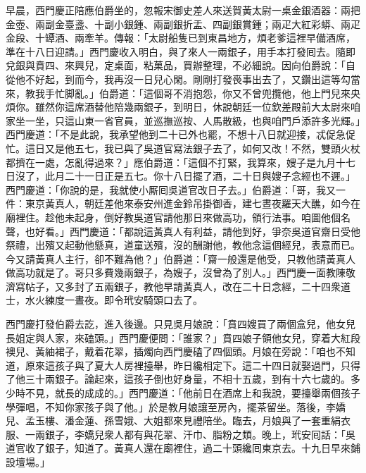 早晨，西門慶正陪應伯爵坐的，忽報宋御史差人來送賀黃太尉一桌金銀酒器：兩把金壺、兩副金臺盞、十副小銀鍾、兩副銀折盂、四副銀賞鍾；兩疋大紅彩蟒、兩疋金段、十罈酒、兩牽羊。傳報：「太尉船隻已到東昌地方，煩老爹這裡早備酒席，準在十八日迎請。」西門慶收入明白，與了來人一兩銀子，用手本打發囘去。隨即兌銀與賁四、來興兒，定桌面，粘菓品，買辦整理，不必細說。因向伯爵說：「自從他不好起，到而今，我再沒一日兒心閑。剛剛打發䘮事出去了，又鑽出這等勾當來，教我手忙脚亂。」{}伯爵道：「這個哥不消抱怨，你又不曾兜攬他，他上門兒來央煩你。雖然你這席酒替他陪幾兩銀子，到明日，休說朝廷一位欽差殿前大太尉來咱家坐一坐，只這山東一省官員，並巡撫巡按、人馬散級，也與咱門戶添許多光輝。」{}西門慶道：「不是此說，我承望他到二十已外也罷，不想十八日就迎接，忒促急促忙。這日又是他五七，我已與了吳道官寫法銀子去了，如何又改！不然，雙頭火杖都擠在一處，怎亂得過來？」應伯爵道：「這個不打緊，我算來，嫂子是九月十七日沒了，此月二十一日正是五七。你十八日擺了酒，二十日與嫂子念經也不遲。」西門慶道：「你說的是，我就使小厮囘吳道官改日子去。」伯爵道：「哥，我又一件：東京黃真人，朝廷差他來泰安州進金鈴吊掛御香，建七晝夜羅天大醮，如今在廟裡住。趁他未起身，倒好教吳道官請他那日來做高功，領行法事。咱圖他個名聲，也好看。」{}西門慶道：「都說這黃真人有利益，{}請他到好，爭奈吳道官齋日受他祭禮，出殯又起動他懸真，道童送殯，沒的酬謝他，教他念這個經兒，表意而已。今又請黃真人主行，卻不難為他？」伯爵道：「齋一般還是他受，只教他請黃真人做高功就是了。哥只多費幾兩銀子，為嫂子，沒曾為了別人。」{}西門慶一面教陳敬濟寫帖子，又多封了五兩銀子，教他早請黃真人，改在二十日念經，二十四衆道士，水火練度一晝夜。即令玳安騎頭口去了。

西門慶打發伯爵去訖，進入後邊。只見吳月娘說：「賁四嫂買了兩個盒兒，他女兒長姐定與人家，來磕頭。」西門慶便問：「誰家？」賁四娘子領他女兒，穿着大紅段襖兒、黃紬裙子，戴着花翠，插燭向西門慶磕了四個頭。月娘在旁說：「咱也不知道，原來這孩子與了夏大人房裡擡舉，昨日纔相定下。{}這二十四日就娶過門，只得了他三十兩銀子。論起來，這孩子倒也好身量，不相十五歲，到有十六七歲的。多少時不見，就長的成成的。」西門慶道：「他前日在酒席上和我說，要擡舉兩個孩子學彈唱，不知你家孩子與了他。」於是教月娘讓至房內，擺茶留坐。落後，李嬌兒、孟玉樓、潘金蓮、孫雪娥、大姐都來見禮陪坐。臨去，月娘與了一套重絹衣服、一兩銀子，李嬌兒衆人都有與花翠、汗巾、脂粉之類。晚上，玳安囘話：「吳道官收了銀子，知道了。黃真人還在廟裡住，過二十頭纔囘東京去。十九日早來鋪設壇場。」

